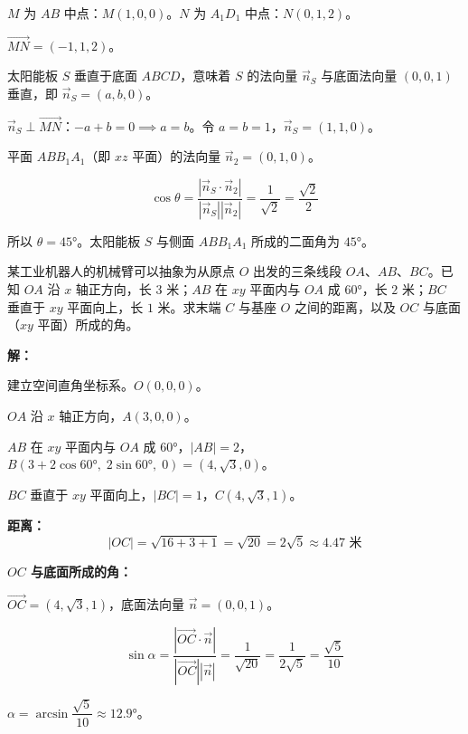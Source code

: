 \documentclass[12pt, a4paper]{ctexart}
\begin{document}
$M$ 为 $AB$ 中点：$M(1,0,0)$。$N$ 为 $A_1D_1$ 中点：$N(0,1,2)$。

$\overrightarrow{MN}=(-1,1,2)$。

太阳能板 $S$ 垂直于底面 $ABCD$，意味着 $S$ 的法向量 $\vec{n}_S$ 与底面法向量 $(0,0,1)$ 垂直，即 $\vec{n}_S=(a,b,0)$。

$\vec{n}_S\perp\overrightarrow{MN}$：$-a+b=0\implies a=b$。令 $a=b=1$，$\vec{n}_S=(1,1,0)$。

平面 $ABB_1A_1$（即 $xz$ 平面）的法向量 $\vec{n}_2=(0,1,0)$。

\[
\cos\theta=\frac{|\vec{n}_S\cdot\vec{n}_2|}{|\vec{n}_S||\vec{n}_2|}=\frac{1}{\sqrt{2}}=\frac{\sqrt{2}}{2}
\]

所以 $\theta=45°$。太阳能板 $S$ 与侧面 $ABB_1A_1$ 所成的二面角为 $45°$。

\begin{appbox}[【应用3】工业机器人臂的空间定位]
某工业机器人的机械臂可以抽象为从原点 $O$ 出发的三条线段 $OA$、$AB$、$BC$。已知 $OA$ 沿 $x$ 轴正方向，长 $3$ 米；$AB$ 在 $xy$ 平面内与 $OA$ 成 $60°$，长 $2$ 米；$BC$ 垂直于 $xy$ 平面向上，长 $1$ 米。求末端 $C$ 与基座 $O$ 之间的距离，以及 $OC$ 与底面（$xy$ 平面）所成的角。
\end{appbox}

\textbf{解：}

建立空间直角坐标系。$O(0,0,0)$。

$OA$ 沿 $x$ 轴正方向，$A(3,0,0)$。

$AB$ 在 $xy$ 平面内与 $OA$ 成 $60°$，$|AB|=2$，$B(3+2\cos60°,\;2\sin60°,\;0)=(4,\sqrt{3},0)$。

$BC$ 垂直于 $xy$ 平面向上，$|BC|=1$，$C(4,\sqrt{3},1)$。

\textbf{距离：}
\[
|OC|=\sqrt{16+3+1}=\sqrt{20}=2\sqrt{5}\approx4.47\text{ 米}
\]

\textbf{$OC$ 与底面所成的角：}

$\overrightarrow{OC}=(4,\sqrt{3},1)$，底面法向量 $\vec{n}=(0,0,1)$。

\[
\sin\alpha=\frac{|\overrightarrow{OC}\cdot\vec{n}|}{|\overrightarrow{OC}||\vec{n}|}=\frac{1}{\sqrt{20}}=\frac{1}{2\sqrt{5}}=\frac{\sqrt{5}}{10}
\]

$\alpha=\arcsin\dfrac{\sqrt{5}}{10}\approx12.9°$。

\begin{center}
\end{center}
\end{document}
